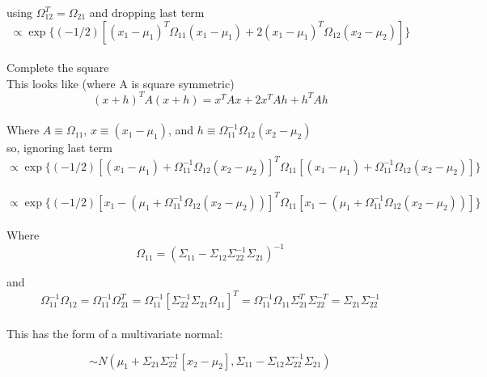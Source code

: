 \documentclass[12pt]{amsart}
\begin{document}
using $\Omega_{12}^T = \Omega_{21}$ and dropping last term\\


\begin{equation*}
\propto \exp \{ (-1/2)[(x_1-\mu_1)^T\Omega_{11}(x_1 - \mu_1)  + 2 (x_1-\mu_1)^T\Omega_{12}(x_2 - \mu_2 ) ]\}
\end{equation*}\\


Complete the square\\

This looks like (where A is square symmetric) \\

$$(x+h)^TA(x+h) = x^TAx+2x^TAh+h^TAh $$\\

Where $A \equiv \Omega_{11}$, $x \equiv (x_1 - \mu_1)$, and $h \equiv \Omega_{11}^{-1}\Omega_{12}(x_2-\mu_2)$ \\


so, ignoring last term\\

\begin{equation*}
\propto \exp \{ (-1/2) [ (x_1 - \mu_1)+\Omega_{11}^{-1}\Omega_{12}(x_2-\mu_2)]^T\Omega_{11} [ (x_1 - \mu_1)+\Omega_{11}^{-1}\Omega_{12}(x_2-\mu_2)]\}
\end{equation*}\\


\begin{equation*}
\propto \exp \{ (-1/2) [ x_1 - (\mu_1+\Omega_{11}^{-1}\Omega_{12}(x_2-\mu_2))]^T\Omega_{11} [ x_1 - (\mu_1+\Omega_{11}^{-1}\Omega_{12}(x_2-\mu_2))]\}
\end{equation*}\\

Where \\

$$ \Omega_{11} = (\Sigma_{11}-\Sigma_{12}\Sigma_{22}^{-1}\Sigma_{21})^{-1} $$

and \\

$$ \Omega_{11}^{-1} \Omega_{12} = \Omega_{11}^{-1}\Omega_{21}^T =\Omega_{11}^{-1} [\Sigma_{22}^{-1}\Sigma_{21}\Omega_{11}]^T = \Omega_{11}^{-1}\Omega_{11}\Sigma_{21}^T\Sigma_{22}^{-T} = \Sigma_{21}\Sigma_{22}^{-1}$$\\

This has the form of a multivariate normal:

$$ \sim N(\mu_1+\Sigma_{21}\Sigma_{22}^{-1}[x_2-\mu_2],\Sigma_{11}-\Sigma_{12}\Sigma_{22}^{-1}\Sigma_{21})$$\\
\end{document}
